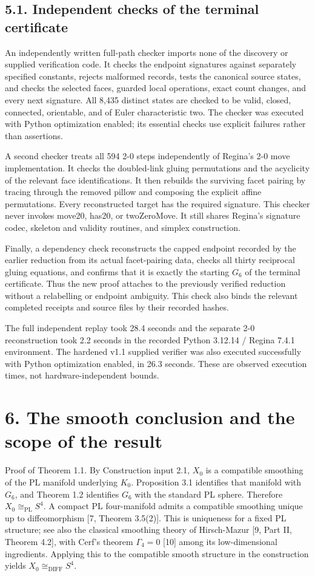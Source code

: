 \documentclass[11pt,letterpaper]{article}
\begin{document}
\subsection*{5.1. Independent checks of the terminal certificate}
An independently written full-path checker imports none of the discovery or supplied verification code. It checks the endpoint signatures against separately specified constants, rejects malformed records, tests the canonical source states, and checks the selected faces, guarded local operations, exact count changes, and every next signature. All 8,435 distinct states are checked to be valid, closed, connected, orientable, and of Euler characteristic two. The checker was executed with Python optimization enabled; its essential checks use explicit failures rather than assertions.

A second checker treats all 594 2-0 steps independently of Regina's 2-0 move implementation. It checks the doubled-link gluing permutations and the acyclicity of the relevant face identifications. It then rebuilds the surviving facet pairing by tracing through the removed pillow and composing the explicit affine permutations. Every reconstructed target has the required signature. This checker never invokes move20, has20, or twoZeroMove. It still shares Regina's signature codec, skeleton and validity routines, and simplex construction.

Finally, a dependency check reconstructs the capped endpoint recorded by the earlier reduction from its actual facet-pairing data, checks all thirty reciprocal gluing equations, and confirms that it is exactly the starting $G_6$ of the terminal certificate. Thus the new proof attaches to the previously verified reduction without a relabelling or endpoint ambiguity. This check also binds the relevant completed receipts and source files by their recorded hashes.

The full independent replay took 28.4 seconds and the separate 2-0 reconstruction took 2.2 seconds in the recorded Python 3.12.14 / Regina 7.4.1 environment. The hardened v1.1 supplied verifier was also executed successfully with Python optimization enabled, in 26.3 seconds. These are observed execution times, not hardware-independent bounds.

\section*{6. The smooth conclusion and the scope of the result}
Proof of Theorem 1.1. By Construction input 2.1, $X_0$ is a compatible smoothing of the PL manifold underlying $K_0$. Proposition 3.1 identifies that manifold with $G_6$, and Theorem 1.2 identifies $G_6$ with the standard PL sphere. Therefore $X_0\cong_{\mathrm{PL}}S^4$. A compact PL four-manifold admits a compatible smoothing unique up to diffeomorphism [7, Theorem 3.5(2)]. This is uniqueness for a fixed PL structure; see also the classical smoothing theory of Hirsch-Mazur [9, Part II, Theorem 4.2], with Cerf's theorem $\Gamma_4=0$ [10] among its low-dimensional ingredients. Applying this to the compatible smooth structure in the construction yields $X_0\cong_{\mathrm{DIFF}}S^4$.
\end{document}

